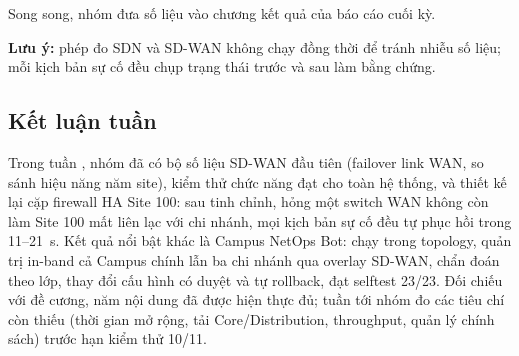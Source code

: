 Song song, nhóm đưa số liệu vào chương kết quả của báo cáo cuối kỳ.

\textbf{Lưu ý:} phép đo SDN và SD-WAN không chạy đồng thời để tránh nhiễu số liệu; mỗi kịch bản sự cố đều chụp trạng thái trước và sau làm bằng chứng.

\subsection{Kết luận tuần}

Trong tuần \tuanbaocao, nhóm đã có bộ số liệu SD-WAN đầu tiên (failover link WAN, so sánh hiệu năng năm site), kiểm thử chức năng đạt cho toàn hệ thống, và thiết kế lại cặp firewall HA Site 100: sau tinh chỉnh, hỏng một switch WAN không còn làm Site 100 mất liên lạc với chi nhánh, mọi kịch bản sự cố đều tự phục hồi trong 11--21~s. Kết quả nổi bật khác là Campus NetOps Bot: chạy trong topology, quản trị in-band cả Campus chính lẫn ba chi nhánh qua overlay SD-WAN, chẩn đoán theo lớp, thay đổi cấu hình có duyệt và tự rollback, đạt selftest 23/23. Đối chiếu với đề cương, năm nội dung đã được hiện thực đủ; tuần tới nhóm đo các tiêu chí còn thiếu (thời gian mở rộng, tải Core/Distribution, throughput, quản lý chính sách) trước hạn kiểm thử 10/11.
